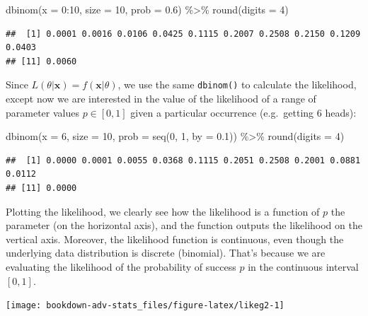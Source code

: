 \documentclass[
]{book}
\newenvironment{Shaded}{\begin{snugshade}}{\end{snugshade}}
\newcommand{\AttributeTok}[1]{\textcolor[rgb]{0.77,0.63,0.00}{#1}}
\newcommand{\DecValTok}[1]{\textcolor[rgb]{0.00,0.00,0.81}{#1}}
\newcommand{\FloatTok}[1]{\textcolor[rgb]{0.00,0.00,0.81}{#1}}
\newcommand{\FunctionTok}[1]{\textcolor[rgb]{0.00,0.00,0.00}{#1}}
\newcommand{\NormalTok}[1]{#1}
\newcommand{\SpecialCharTok}[1]{\textcolor[rgb]{0.00,0.00,0.00}{#1}}
\newcommand{\bx}{{\boldsymbol x}}
\theoremstyle{definition}
\theoremstyle{definition}
\theoremstyle{definition}
\theoremstyle{definition}
\theoremstyle{remark}
\begin{document}
\begin{Shaded}
\begin{Highlighting}[]
\FunctionTok{dbinom}\NormalTok{(}\AttributeTok{x =} \DecValTok{0}\SpecialCharTok{:}\DecValTok{10}\NormalTok{, }\AttributeTok{size =} \DecValTok{10}\NormalTok{, }\AttributeTok{prob =} \FloatTok{0.6}\NormalTok{) }\SpecialCharTok{\%\textgreater{}\%} 
    \FunctionTok{round}\NormalTok{(}\AttributeTok{digits =} \DecValTok{4}\NormalTok{)}
\end{Highlighting}
\end{Shaded}

\begin{verbatim}
##  [1] 0.0001 0.0016 0.0106 0.0425 0.1115 0.2007 0.2508 0.2150 0.1209 0.0403
## [11] 0.0060
\end{verbatim}

Since \(L(\theta|\bx) = f(\bx|\theta)\), we use the same \texttt{dbinom()} to calculate the likelihood, except now we are interested in the value of the likelihood of a range of parameter values \(p\in[0,1]\) given a particular occurrence (e.g.~getting 6 heads):

\begin{Shaded}
\begin{Highlighting}[]
\FunctionTok{dbinom}\NormalTok{(}\AttributeTok{x =} \DecValTok{6}\NormalTok{, }\AttributeTok{size =} \DecValTok{10}\NormalTok{, }\AttributeTok{prob =} \FunctionTok{seq}\NormalTok{(}\DecValTok{0}\NormalTok{, }\DecValTok{1}\NormalTok{, }\AttributeTok{by =} \FloatTok{0.1}\NormalTok{)) }\SpecialCharTok{\%\textgreater{}\%} 
    \FunctionTok{round}\NormalTok{(}\AttributeTok{digits =} \DecValTok{4}\NormalTok{)}
\end{Highlighting}
\end{Shaded}

\begin{verbatim}
##  [1] 0.0000 0.0001 0.0055 0.0368 0.1115 0.2051 0.2508 0.2001 0.0881 0.0112
## [11] 0.0000
\end{verbatim}

Plotting the likelihood, we clearly see how the likelihood is a function of \(p\) the parameter (on the horizontal axis), and the function outputs the likelihood on the vertical axis.
Moreover, the likelihood function is continuous, even though the underlying data distribution is discrete (binomial).
That's because we are evaluating the likelihood of the probability of success \(p\) in the continuous interval \([0,1]\).

\begin{center}\texttt{[image: bookdown-adv-stats\_files/figure-latex/likeg2-1]} \end{center}
\end{document}
